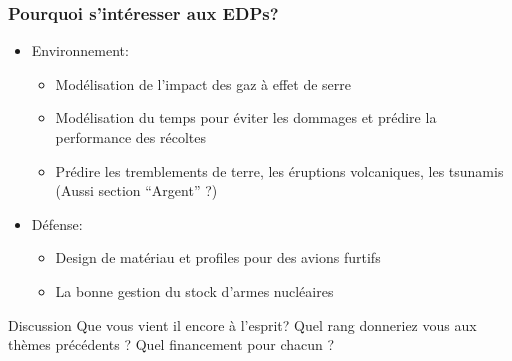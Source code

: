 \begin{frame}
  \frametitle{Pourquoi s'intéresser aux EDPs? }

  \begin{block}{}
      \begin{itemize}
    \item Environnement:
      \begin{itemize}
      \item Modélisation de l'impact des gaz à effet de serre
      \item Modélisation du temps pour éviter les dommages et prédire la performance des récoltes
      \item Prédire les tremblements de terre, les éruptions volcaniques, les tsunamis (Aussi section ``Argent'' ?)
      \end{itemize}
    \item Défense:
      \begin{itemize}
      \item Design de matériau et profiles pour des avions furtifs
      \item La bonne gestion du stock d'armes nucléaires
      \end{itemize}

  \end{itemize}

  \end{block}

  \begin{alertblock}{Discussion}
    Que vous vient il encore à l'esprit? Quel rang donneriez vous aux thèmes précédents ? Quel financement pour chacun ?
  \end{alertblock}
\end{frame}
